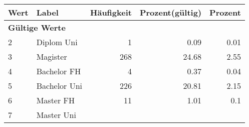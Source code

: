      \begin{longtable}{lXrrr}
     \toprule
     \textbf{Wert} & \textbf{Label} & \textbf{Häufigkeit} & \textbf{Prozent(gültig)} & \textbf{Prozent} \\
     \endhead
     \midrule
     \multicolumn{5}{l}{\textbf{Gültige Werte}}\\

     2 &
     \multicolumn{1}{X}{ Diplom Uni   } &


       \num{1} &
       \num[round-mode=places,round-precision=2]{0,09} &
         \num[round-mode=places,round-precision=2]{0,01} \\

     3 &
     \multicolumn{1}{X}{ Magister   } &


       \num{268} &
       \num[round-mode=places,round-precision=2]{24,68} &
         \num[round-mode=places,round-precision=2]{2,55} \\

     4 &
     \multicolumn{1}{X}{ Bachelor FH   } &


       \num{4} &
       \num[round-mode=places,round-precision=2]{0,37} &
         \num[round-mode=places,round-precision=2]{0,04} \\

     5 &
     \multicolumn{1}{X}{ Bachelor Uni   } &


       \num{226} &
       \num[round-mode=places,round-precision=2]{20,81} &
         \num[round-mode=places,round-precision=2]{2,15} \\

     6 &
     \multicolumn{1}{X}{ Master FH   } &


       \num{11} &
       \num[round-mode=places,round-precision=2]{1,01} &
         \num[round-mode=places,round-precision=2]{0,1} \\

     7 &
     \multicolumn{1}{X}{ Master Uni   } &



\end{longtable}
